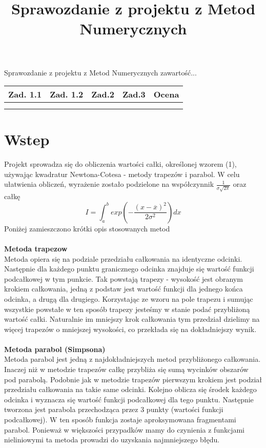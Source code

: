 \documentclass{article}
\title{Sprawozdanie z projektu z Metod Numerycznych}
\begin{document}
		\maketitle	
	\pagestyle{fancy}

	
	Sprawozdanie z projektu z Metod Numerycznych
	zawartość...\\
	\begin{center}
		
		\begin{tabular}{|c|c|c|c|c|}
			\hline
			Zad. 1.1 & Zad. 1.2 &  Zad.2 & Zad.3 & Ocena\\\hline
			 & & & & \\
			 & & & & \\\hline
		\end{tabular}

	\end{center}
	\section{Wstep}
	Projekt sprowadza się do obliczenia wartości całki, określonej wzorem (1), używając kwadratur Newtona-Cotesa - metody trapezów i parabol. W celu ułatwienia obliczeń, wyrażenie zostało podzielone na współczynnik $\frac{1}{\sigma\sqrt{2\pi}}$ oraz całkę
		\begin{equation}
			I = \int_{a}^{b} exp  \left( - \frac{(x-\overline{x})^2}{2\sigma^2}   \right) dx
		\end{equation}
	Poniżej zamieszczono krótki opis stosowanych metod
	\\\\
	\textbf {Metoda trapezow }
	\\ 
	Metoda opiera się na podziale przedziału całkowania na identyczne odcinki. Następnie dla każdego punktu granicznego odcinka znajduje się wartość funkcji podcałkowej w tym punkcie. Tak powstają trapezy - wysokość jest obranym krokiem całkowania, jedną z podstaw jest wartość funkcji dla jednego końca odcinka, a drugą dla drugiego. Korzystając ze wzoru na pole trapezu i sumując wszystkie powstałe w ten sposób trapezy jesteśmy w stanie podać przybliżoną wartość całki. Naturalnie im mniejszy krok całkowania tym przedział dzielimy na więcej trapezów o mniejszej wysokości, co przekłada się na dokładniejszy wynik. 
	\\\\
	\textbf {Metoda parabol (Simpsona)}
	\\ 
	Metoda parabol jest jedną z najdokładniejszych metod przybliżonego całkowania. Inaczej niż w metodzie trapezów całkę przybliża się sumą wycinków obszarów pod parabolą. Podobnie jak w metodzie trapezów pierwszym krokiem jest podział przedziału całkowania na takie same odcinki. Kolejno oblicza się środek każdego odcinka i wyznacza się wartość funkcji podcałkowej dla tego punktu. Następnie tworzona jest parabola przechodząca przez 3 punkty (wartości funkcji podcałkowej). W ten sposób funkcja zostaje aproksymowana fragmentami parabol. Ponieważ w większości przypadków mamy do czynienia z funkcjami nieliniowymi ta metoda prowadzi do uzyskania najmniejszego błędu.  
	
\end{document}
